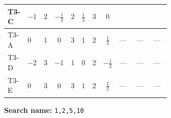\documentclass[8pt]{article}
\begin{document}
\begin{landscape}
\begin{longtable}{@{}llcccccc >{\raggedright\arraybackslash}p{0.21\linewidth} >{\raggedright\arraybackslash}p{0.21\linewidth} >{\raggedright\arraybackslash}p{0.21\linewidth}@{}}
T3-C & $-1$ & $2$ & $-\frac{1}{2}$ & $2$ & $\frac{1}{2}$ & $3$ & $0$ & \scriptsize\adjustbox{max width=\linewidth}{$\begin{gathered} - \frac{i lambda12Inv2 \overline{y_{1}} \overline{y_{2}}}{6 MF}\end{gathered}$} & \scriptsize\adjustbox{max width=\linewidth}{$\begin{gathered} - \frac{\sqrt{3} i g_{2}^{2} \overline{y_{1}} \overline{y_{2}}}{8 MF}\end{gathered}$} & \scriptsize\adjustbox{max width=\linewidth}{$\begin{gathered} \frac{\sqrt{3} i ye \overline{y_{1}} \overline{y_{2}} \overline{ye}}{24 MF}\end{gathered}$} \\
\midrule
T3-A & $0$ & $1$ & $0$ & $3$ & $1$ & $2$ & $\frac{1}{2}$ & --- & --- & --- \\
\midrule
T3-D & $-2$ & $3$ & $-1$ & $1$ & $0$ & $2$ & $-\frac{1}{2}$ & --- & --- & --- \\
\midrule
T3-E & $0$ & $3$ & $0$ & $3$ & $1$ & $2$ & $\frac{1}{2}$ & --- & --- & --- \\
\midrule
\bottomrule
\end{longtable}
\clearpage
\noindent\textbf{Search name: }\texttt{1,2,5,10}\par\smallskip

\end{landscape}
\end{document}
